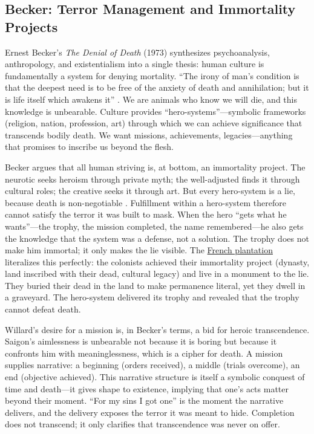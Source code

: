 \subsection*{Becker: Terror Management and Immortality Projects}
\label{ssec:vi-becker}

Ernest Becker's \textit{The Denial of Death} (1973) synthesizes psychoanalysis, anthropology,
and existentialism into a single thesis: human culture is fundamentally a system for denying
mortality. ``The irony of man's condition is that the deepest need is to be free of the
anxiety of death and annihilation; but it is life itself which awakens it''
\parencite[p.~66]{BeckerDenial1973}. We are animals who know we will die, and this knowledge
is unbearable. Culture provides ``hero-systems''---symbolic frameworks (religion, nation,
profession, art) through which we can achieve significance that transcends bodily death. We
want missions, achievements, legacies---anything that promises to inscribe us beyond the flesh.

Becker argues that all human striving is, at bottom, an immortality project. The neurotic
seeks heroism through private myth; the well-adjusted finds it through cultural roles; the
creative seeks it through art. But every hero-system is a lie, because death is non-negotiable
\parencite[pp.~26--27]{BeckerDenial1973}. Fulfillment within a hero-system therefore cannot
satisfy the terror it was built to mask. When the hero ``gets what he wants''---the trophy,
the mission completed, the name remembered---he also gets the knowledge that the system was a
defense, not a solution. The trophy does not make him immortal; it only makes the lie visible.
The \hyperref[scene:french-plantation]{French plantation} literalizes this perfectly: the
colonists achieved their immortality project (dynasty, land inscribed with their dead, cultural
legacy) and live in a monument to the lie. They buried their dead in the land to make
permanence literal, yet they dwell in a graveyard. The hero-system delivered its trophy and
revealed that the trophy cannot defeat death.

Willard's desire for a mission is, in Becker's terms, a bid for heroic transcendence. Saigon's
aimlessness is unbearable not because it is boring but because it confronts him with
meaninglessness, which is a cipher for death. A mission supplies narrative: a beginning
(orders received), a middle (trials overcome), an end (objective achieved). This narrative
structure is itself a symbolic conquest of time and death---it gives shape to existence,
implying that one's acts matter beyond their moment. ``For my sins I got one'' is the moment
the narrative delivers, and the delivery exposes the terror it was meant to hide. Completion
does not transcend; it only clarifies that transcendence was never on offer.

